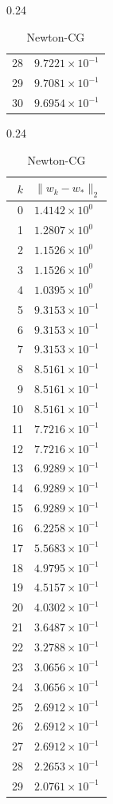 \documentclass[italian, a4paper, twoside, binding=6mm]{sapthesis}
\begin{document}
\begin{table}[H]
\begin{subtable}{0.24\textwidth}
\begin{tabular}{@{}rl@{}}
28 & $9.7221\times10^{-1}$\\
29 & $9.7081\times10^{-1}$\\
30 & $9.6954\times10^{-1}$\\
\bottomrule
\end{tabular}
\end{subtable}\hfill
\begin{subtable}{0.24\textwidth}
\centering
\caption{Newton-CG}
\begin{tabular}{@{}rl@{}}
\toprule
$k$ & $\|w_k-w_*\|_2$\\
\midrule
0 & $1.4142\times10^{0}$\\
1 & $1.2807\times10^{0}$\\
2 & $1.1526\times10^{0}$\\
3 & $1.1526\times10^{0}$\\
4 & $1.0395\times10^{0}$\\
5 & $9.3153\times10^{-1}$\\
6 & $9.3153\times10^{-1}$\\
7 & $9.3153\times10^{-1}$\\
8 & $8.5161\times10^{-1}$\\
9 & $8.5161\times10^{-1}$\\
10 & $8.5161\times10^{-1}$\\
11 & $7.7216\times10^{-1}$\\
12 & $7.7216\times10^{-1}$\\
13 & $6.9289\times10^{-1}$\\
14 & $6.9289\times10^{-1}$\\
15 & $6.9289\times10^{-1}$\\
16 & $6.2258\times10^{-1}$\\
17 & $5.5683\times10^{-1}$\\
18 & $4.9795\times10^{-1}$\\
19 & $4.5157\times10^{-1}$\\
20 & $4.0302\times10^{-1}$\\
21 & $3.6487\times10^{-1}$\\
22 & $3.2788\times10^{-1}$\\
23 & $3.0656\times10^{-1}$\\
24 & $3.0656\times10^{-1}$\\
25 & $2.6912\times10^{-1}$\\
26 & $2.6912\times10^{-1}$\\
27 & $2.6912\times10^{-1}$\\
28 & $2.2653\times10^{-1}$\\
29 & $2.0761\times10^{-1}$\\

\end{tabular}
\end{subtable}
\end{table}
\end{document}
